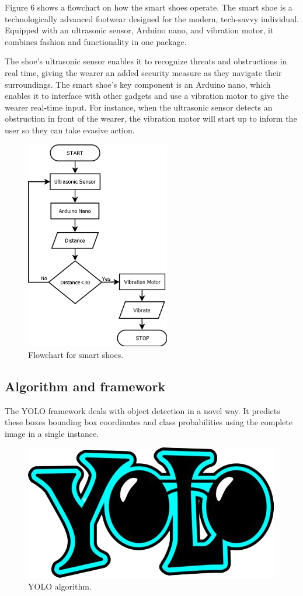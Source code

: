 \documentclass[conference]{IEEEtran}
\begin{document}
Figure 6 shows a flowchart on how the smart shoes operate. The smart shoe is a technologically advanced footwear designed for the modern, tech-savvy individual. Equipped with an ultrasonic sensor, Arduino nano, and vibration motor, it combines fashion and functionality in one package.

The shoe's ultrasonic sensor enables it to recognize threats and obstructions in real time, giving the wearer an added security measure as they navigate their surroundings. The smart shoe's key component is an Arduino nano, which enables it to interface with other gadgets and use a vibration motor to give the wearer real-time input. For instance, when the ultrasonic sensor detects an obstruction in front of the wearer, the vibration motor will start up to inform the user so they can take evasive action.

\begin{figure}[h]
\centering
\includegraphics[width=2.4in\textwidth, height=3.6in]{flowchart_lower_300_DPI.png}
\caption{Flowchart for smart shoes.}
\label{fig_sim}
\end{figure}

\subsection{Algorithm and framework}
The YOLO framework deals with object detection in a novel way. It predicts these boxes bounding box coordinates and class probabilities using the complete image in a single instance. 

\begin{figure}[h]
\centering
\includegraphics[width=2in\textwidth]{YOLO_300_DPI.png}
\caption{YOLO algorithm.}
\label{fig_sim}
\end{figure}
\end{document}
